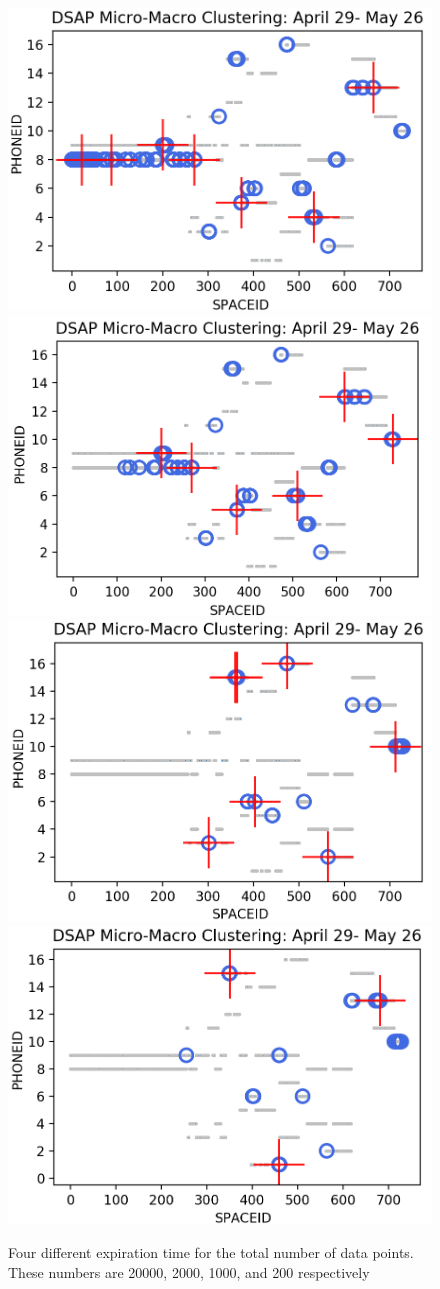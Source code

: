 \begin{figure}[!ht]
    \centering
        \includegraphics[width = 7.5 cm]{image/Chapters/Chapter6/DSAPalldays.png}\hfill
        \includegraphics[width = 7.5 cm]{image/Chapters/Chapter6/DSAPalldays2000fad.png}\hfill
        \includegraphics[width = 7.5 cm]{image/Chapters/Chapter6/DSAPalldays1000fad.png}\hfill
        \includegraphics[width = 7.5 cm]{image/Chapters/Chapter6/DSAPalldays200fad.png}\hfill
    \caption{Four different expiration time for the total number of data points. These numbers are 20000, 2000, 1000, and 200 respectively}
    \label{expirationchang}
\end{figure}





